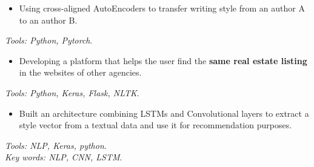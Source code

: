 
\begin{itemize}
\item {Using cross-aligned AutoEncoders to transfer writing style from an author A to an author B.}
\end{itemize}
\textit{Tools: Python, Pytorch}. \\
\divider
{}
\begin{itemize}
\item {Developing a platform that helps the user find the \textbf{same real estate listing} in the websites of other agencies.}
\end{itemize}
\textit{Tools: Python, Keras, Flask, NLTK}.\\
\divider
{}
\begin{itemize}
\item {Built an architecture combining LSTMs and Convolutional layers to extract a
style vector from a textual data and use it for recommendation purposes.}
\end{itemize}
\textit{Tools: NLP, Keras, python}. \\
\textit{Key words: NLP, CNN, LSTM}.
